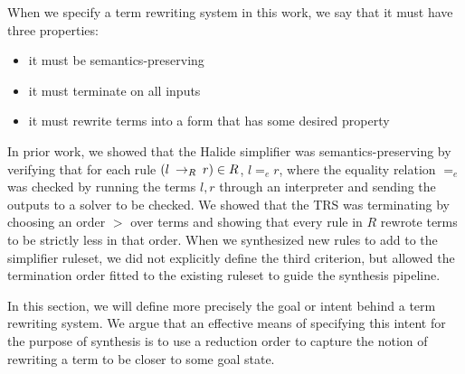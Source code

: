 When we specify a term rewriting system in this work, we say that it must have three properties:

\begin{itemize}
    \item it must be semantics-preserving
    \item it must terminate on all inputs
    \item it must rewrite terms into a form that has some desired property
\end{itemize}

In prior work, we showed that the Halide simplifier was semantics-preserving by verifying that for each rule $(l \:\rightarrow_{R}\: r) \in R$, $l =_e r$, where the equality relation $=_e$ was checked by running the terms $l, r$ through an interpreter and sending the outputs to a solver to be checked. We showed that the TRS was terminating by choosing an order $>$ over terms and showing that every rule in $R$ rewrote terms to be strictly less in that order. When we synthesized new rules to add to the simplifier ruleset, we did not explicitly define the third criterion, but allowed the termination order fitted to the existing ruleset to guide the synthesis pipeline. 

In this section, we will define more precisely the goal or intent behind a term rewriting system. We argue that an effective means of specifying this intent for the purpose of synthesis is to use a reduction order to capture the notion of rewriting a term to be closer to some goal state.

